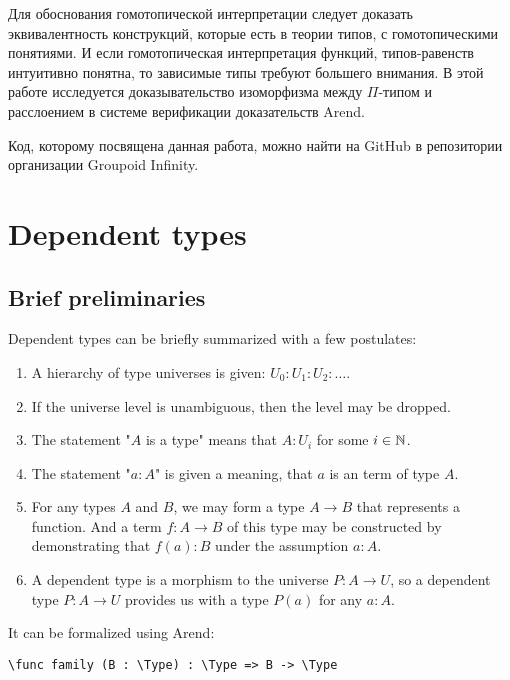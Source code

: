Для обоснования гомотопической интерпретации следует доказать эквивалентность конструкций, которые есть в теории типов, с гомотопическими понятиями. И если гомотопическая интерпретация функций, типов-равенств интуитивно понятна, то зависимые типы требуют большего внимания. В этой работе исследуется доказывательство изоморфизма между $\Pi$-типом и расслоением в системе верификации доказательств Arend. 

Код, которому посвящена данная работа, можно найти на GitHub \autocite{Grp1} в репозитории организации Groupoid Infinity.

\section{Dependent types}

\subsection{Brief preliminaries}

Dependent types can be briefly summarized with a few postulates:
\begin{enumerate}
  \item A hierarchy of type universes is given: $U_0 : U_1 : U_2 : \dots$.
  \item If the universe level is unambiguous, then the level may be dropped.
  \item The statement "$A$ is a type" means that $A : U_i$ for some $i \in \mathbb N$.
  \item The statement "$a : A$" is given a meaning, that $a$ is an term of type $A$.
  \item For any types $A$ and $B$, we may form a type $A \to B$ that represents a function. And a term $f : A \to B$ of this type may be constructed by demonstrating that $f(a) : B$ under the assumption $a : A$.
  \item A dependent type is a morphism to the universe $P : A \to U$, so a dependent type $P : A \to U$ provides us with a type $P(a)$ for any $a : A$.
\end{enumerate}

It can be formalized using Arend:

\begin{ListingEnv}[H]
\begin{lstlisting}
\func family (B : \Type) : \Type => B -> \Type
\end{lstlisting}
\end{ListingEnv}

